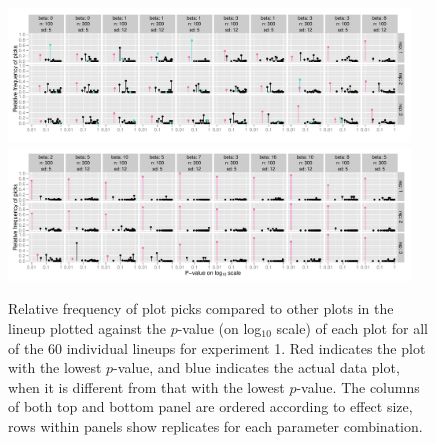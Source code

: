 \documentclass[12pt]{article}
\begin{document}
\begin{figure}[hbtp]
   \centering
      \includegraphics[width=0.95\textwidth]{p_val_log_counts-a.pdf}
       \includegraphics[width=0.95\textwidth]{p_val_log_counts-b.pdf}
       \caption{Relative frequency of plot picks compared to other plots in the lineup plotted against the $p$-value (on log$_{10}$ scale) of each plot for all of the 60 individual lineups for experiment 1. Red indicates the plot with the lowest $p$-value, and blue indicates the actual data plot, when it is different from that with the lowest $p$-value. The columns of both top and bottom panel are ordered according to effect size, rows within panels show replicates for each parameter combination.}
       \label{fig:P-val_log}
\end{figure}
\end{document}
